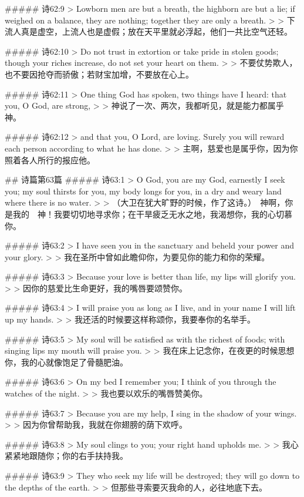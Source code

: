 ##### 诗62:9
> Lowborn men are but a breath, the highborn are but a lie; if weighed on a balance, they are nothing; together they are only a breath.
>
> 下流人真是虚空，上流人也是虚假；放在天平里就必浮起，他们一共比空气还轻。


##### 诗62:10
> Do not trust in extortion or take pride in stolen goods; though your riches increase, do not set your heart on them.
>
> 不要仗势欺人，也不要因抢夺而骄傲；若财宝加增，不要放在心上。


##### 诗62:11
> One thing God has spoken, two things have I heard: that you, O God, are strong,
>
> 神说了一次、两次，我都听见，就是能力都属乎　神。


##### 诗62:12
> and that you, O Lord, are loving. Surely you will reward each person according to what he has done.
>
> 主啊，慈爱也是属乎你，因为你照着各人所行的报应他。


## 诗篇第63篇
##### 诗63:1
> O God, you are my God, earnestly I seek you; my soul thirsts for you, my body longs for you, in a dry and weary land where there is no water.
>
> （大卫在犹大旷野的时候，作了这诗。）　神啊，你是我的　神！我要切切地寻求你；在干旱疲乏无水之地，我渴想你，我的心切慕你。


##### 诗63:2
> I have seen you in the sanctuary and beheld your power and your glory.
>
> 我在圣所中曾如此瞻仰你，为要见你的能力和你的荣耀。


##### 诗63:3
> Because your love is better than life, my lips will glorify you.
>
> 因你的慈爱比生命更好，我的嘴唇要颂赞你。


##### 诗63:4
> I will praise you as long as I live, and in your name I will lift up my hands.
>
> 我还活的时候要这样称颂你，我要奉你的名举手。


##### 诗63:5
> My soul will be satisfied as with the richest of foods; with singing lips my mouth will praise you.
>
> 我在床上记念你，在夜更的时候思想你，我的心就像饱足了骨髓肥油。


##### 诗63:6
> On my bed I remember you; I think of you through the watches of the night.
>
> 我也要以欢乐的嘴唇赞美你。


##### 诗63:7
> Because you are my help, I sing in the shadow of your wings.
>
> 因为你曾帮助我，我就在你翅膀的荫下欢呼。


##### 诗63:8
> My soul clings to you; your right hand upholds me.
>
> 我心紧紧地跟随你；你的右手扶持我。


##### 诗63:9
> They who seek my life will be destroyed; they will go down to the depths of the earth.
>
> 但那些寻索要灭我命的人，必往地底下去。



